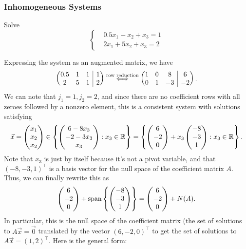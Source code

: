 \documentclass[main.tex]{subfiles}
\begin{document}
\subsubsection{Inhomogeneous Systems}

\begin{example}
Solve
\[\left\{\begin{aligned}
&0.5x_1 + x_2 + x_3 = 1 \\
&2x_1 + 5x_2 + x_3 = 2
\end{aligned}\right.\]
\end{example}
Expressing the system as an augmented matrix, we have
\[\left(\begin{array}{@{}c c c | c@{}}
    0.5 & 1 & 1 & 1 \\
    2 & 5 & 1 & 2
\end{array}\right)\overset{\text{row reduction}}{\iff} \left(\begin{array}{@{}c c c | c@{}}
    1 & 0 & 8 & 6 \\
    0 & 1 & -3 & -2
\end{array}\right).\]
We can note that $j_1 = 1, j_2 = 2$, and since there are no coefficient rows with all zeroes followed by a nonzero element, this is a consistent system with solutions satisfying
\[\vec{x} = \begin{pmatrix} x_1 \\ x_2 \\ x_2 \end{pmatrix} \in \left\{\begin{pmatrix} 6 - 8x_3 \\ -2 - 3x_3 \\ x_3 \end{pmatrix} : x_3 \in \mathbb R\right\} = \left\{\begin{pmatrix} 6 \\ -2 \\ 0\end{pmatrix} + x_3\begin{pmatrix} -8 \\ -3 \\ 1 \end{pmatrix} : x_3 \in \mathbb R\right\}.\]
Note that $x_3$ is just by itself because it's not a pivot variable, and that $(-8, -3, 1)^\top$ is a basis vector for the null space of the coefficient matrix $A$. Thus, we can finally rewrite this as
\[\begin{pmatrix} 6 \\ -2 \\ 0\end{pmatrix} + \operatorname{span}\left\{\begin{pmatrix} -8 \\ -3 \\ 1 \end{pmatrix}\right\} = \begin{pmatrix} 6 \\ -2 \\ 0\end{pmatrix} + N(A).\]
In particular, this is the null space of the coefficient matrix (the set of solutions to $A\vec{x} = \vec{0}$ translated by the vector $(6, -2, 0)^\top$ to get the set of solutions to $A\vec{x} = (1, 2)^\top$. Here is the general form:
\end{document}
